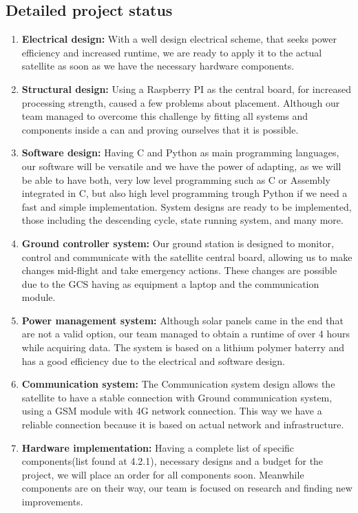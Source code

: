 \documentclass[11pt]{article}
\begin{document}
\subsection{Detailed project status}
\begin{enumerate}
    \item\textbf{Electrical design:}  {With a well design electrical scheme, that seeks power efficiency and increased runtime, we are ready to apply it to the actual satellite as soon as we have the necessary hardware components.}
    \item\textbf{Structural design:} {Using a Raspberry PI as the central board, for increased processing strength, caused a few problems about placement. Although our team managed to overcome this challenge by fitting all systems and components inside a can and proving ourselves that it is possible.}
    \item\textbf{Software design:} {Having C and Python as main programming languages, our software will be versatile and we have the power of adapting, as we will be able to have both, very low level programming such as C or Assembly integrated in C, but also high level programming trough Python if we need a fast and simple implementation. System designs are ready to be implemented, those including the descending cycle, state running system, and many more.}
    \item\textbf{Ground controller system:} {Our ground station is designed to monitor, control and communicate with the satellite central board, allowing us to make changes mid-flight and take emergency actions. These changes are possible due to the GCS having as equipment a laptop and the communication module.}
    \item\textbf{Power management system:} {Although solar panels came in the end that are not a valid option, our team managed to obtain a runtime of over 4 hours while acquiring data. The system is based on a lithium polymer baterry and has a good efficiency due to the electrical and software design.}
    \item\textbf{Communication system:} {The Communication system design allows the satellite to have a stable connection with Ground communication system, using a GSM module with 4G network connection. This way we have a reliable connection because it is based on actual network and infrastructure.}
    \item\textbf{Hardware implementation:} {Having a complete list of specific components(list found at 4.2.1), necessary designs and a budget for the project, we will place an order for all components soon. Meanwhile components are on their way, our team is focused on research and finding new improvements.}

\end{enumerate}
\end{document}
